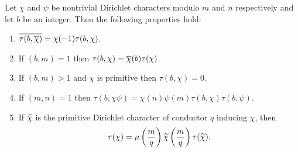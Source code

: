     \begin{proposition}\label{prop:Gauss_sum_reduction}
      Let \(\chi\) and \(\psi\) be nontrivial Dirichlet characters modulo \(m\) and \(n\) respectively and let \(b\) be an integer. Then the following properties hold:
      \begin{enumerate}[label*=(\roman*)]
        \item \(\overline{\tau(b,\overline{\chi})} = \chi(-1)\tau(b,\chi)\).
        \item If \((b,m) = 1\) then \(\tau(b,\chi) = \overline{\chi}(b)\tau(\chi)\).
        \item If \((b,m) > 1\) and \(\chi\) is primitive then \(\tau(b,\chi) = 0\).
        \item If \((m,n) = 1\) then \(\tau(b,\chi\psi) = \chi(n)\psi(m)\tau(b,\chi)\tau(b,\psi)\).
        \item If \(\widetilde{\chi}\) is the primitive Dirichlet character of conductor \(q\) inducing \(\chi\), then
        \[
          \tau(\chi) = \mu\left(\frac{m}{q}\right)\widetilde{\chi}\left(\frac{m}{q}\right)\tau(\widetilde{\chi}).
        \]
      \end{enumerate}
    \end{proposition}

